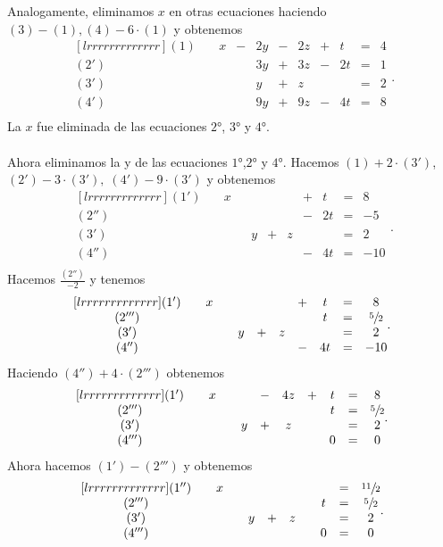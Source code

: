 \documentclass{article}
\theoremstyle{definition}
\theoremstyle{definition}
\theoremstyle{remark}
\begin{document}
Analogamente, eliminamos $x$ en otras ecuaciones haciendo $(3)-(1), (4)-6\cdot(1)$ y obtenemos
\[
  \begin{matrix}[lrrrrrrrrrrrrr]
    (1) \quad &  x & - & 2y & - & 2z & + & t & = & 4 \\
    (2') \quad &  & & 3y & + & 3z & - & 2t & = & 1 \\
    (3') \quad &  &  & y & + & z &  &  & = & 2 \\
    (4') \quad &  &  & 9y & + & 9z & - & 4t & = & 8\\
\end{matrix}.
\]
La $x$ fue eliminada de las ecuaciones $2$°, $3$° y $4$°.\\\\
Ahora eliminamos la y de las ecuaciones $1$°,$2$° y $4$°. Hacemos $(1)+2\cdot (3')$, $(2')-3\cdot(3'),\;(4')-9\cdot(3')$ y obtenemos
\[
  \begin{matrix}[lrrrrrrrrrrrrr]
    (1') \quad &  x &  &  &  &  & + & t & = & 8 \\
    (2'') \quad &  & &  &  &  & - & 2t & = & -5 \\
    (3') \quad &  &  & y & + & z &  &  & = & 2 \\
    (4'') \quad &  &  &  &  &  & - & 4t & = & -10\\
\end{matrix}.
\]
Hacemos $\frac{(2'')}{-2}$ y tenemos
\[
  \begin{matrix}[lrrrrrrrrrrrrr]
  (1') \quad &  x &  &  &  &  & + & t & = & 8 \\
    (2''') \quad &  & &  &  &  &  & t & = & \sfrac{5}{2} \\
    (3') \quad &  &  & y & + & z &  &  & = & 2 \\
    (4'') \quad &  &  &  &  &  & - & 4t & = & -10\\
\end{matrix}.
\]
Haciendo $(4'')+4\cdot(2''')$ obtenemos
\[
  \begin{matrix}[lrrrrrrrrrrrrr]
    (1') \quad &  x &  &  & - & 4z & + & t & = & 8 \\
    (2''') \quad &  & &  &  &  &  & t & = & \sfrac{5}{2} \\
    (3') \quad &  &  & y & + & z &  &  & = & 2 \\
    (4''') \quad &  &  &  &  &  &  &  0 & = & 0 \\
\end{matrix}.
\]
Ahora hacemos $(1')-(2''')$ y obtenemos \[
  \begin{matrix}[lrrrrrrrrrrrrr]
    (1'') \quad &  x &  &  &  &  &  &  & = & \sfrac{11}{2} \\
    (2''') \quad &  & &  &  &  &  & t & = & \sfrac{5}{2} \\
    (3') \quad &  &  & y & + & z &  &  & = & 2 \\
    (4''') \quad &  &  &  &  &  &  &  0 & = & 0 \\
\end{matrix}.
\]
\end{document}
